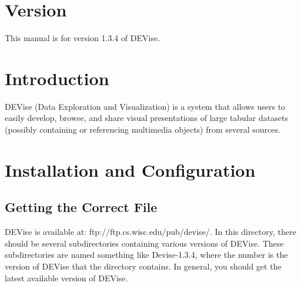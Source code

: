 \maketitle


\section{Version}

This manual is for version 1.3.4 of DEVise.


\section{Introduction}

DEVise (Data Exploration and Visualization) is a system that allows users to easily develop,
browse, and share visual presentations of large tabular datasets (possibly containing or
referencing multimedia objects) from several sources. 



\section{Installation and Configuration}

\subsection{Getting the Correct  File}

DEVise is available at: ftp://ftp.cs.wisc.edu/pub/devise/.
In this directory, there should be several subdirectories containing various versions
of DEVise.  These subdirectories are named something like Devise-1.3.4, where the
number is the version of DEVise that the directory contains.  In general,
you should get the latest available version of DEVise.

